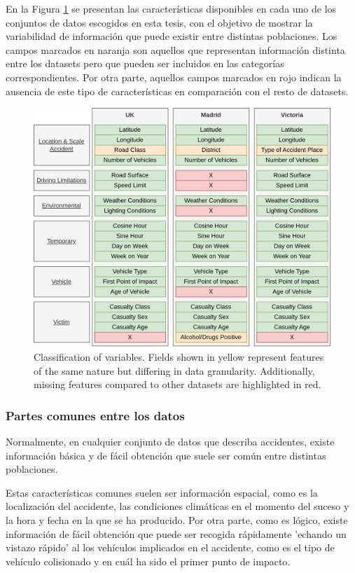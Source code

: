 \documentclass{uathesis-es}
\begin{document}
{En la Figura \ref{FeaturesClassification} se presentan las características disponibles en cada uno de los conjuntos de datos escogidos en esta tesis, con el objetivo de mostrar la variabilidad de información que puede existir entre distintas poblaciones. Los campos marcados en naranja son aquellos que representan información distinta entre los datasets pero que pueden ser incluidos en las categorías correspondientes. Por otra parte, aquellos campos marcados en rojo indican la ausencia de este tipo de características en comparación con el resto de datasets.

\begin{figure}[H]
    \centering
    \includegraphics[width=14cm]{Figures/Dataset Comparative.png}
    \caption{Classification of variables. Fields shown in yellow represent features of the same nature but differing in data granularity. Additionally, missing features compared to other datasets are highlighted in red.}
    \label{FeaturesClassification}
\end{figure}

\subsubsection{Partes comunes entre los datos}

Normalmente, en cualquier conjunto de datos que describa accidentes, existe información básica y de fácil obtención que suele ser común entre distintas poblaciones.

Estas características comunes suelen ser información espacial, como es la localización del accidente, las condiciones climáticas en el momento del suceso y la hora y fecha en la que se ha producido. Por otra parte, como es lógico, existe información de fácil obtención que puede ser recogida rápidamente 'echando un vistazo rápido' al los vehículos implicados en el accidente, como es el tipo de vehículo colisionado y en cuál ha sido el primer punto de impacto.


}
\end{document}
